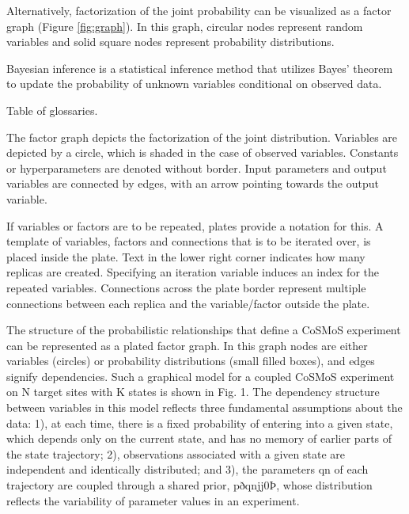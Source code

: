 Alternatively, factorization of the joint probability can be visualized as a factor graph (Figure \ref{fig:graph}). In this graph, circular nodes represent random variables and solid square nodes represent probability distributions.

Bayesian inference is a statistical inference method that utilizes Bayes' theorem to update the probability of unknown variables conditional on observed data.

Table of glossaries.

The factor graph depicts the factorization of the joint distribution. Variables are depicted by a circle, which is shaded in the case of observed variables. Constants or hyperparameters are denoted without border. Input parameters and output variables are connected by edges, with an arrow pointing towards the output variable.

If variables or factors are to be repeated, plates provide a notation for this. A template of variables, factors and connections that is to be iterated over, is placed inside the plate. Text in the lower right corner indicates how many replicas are created. Specifying an iteration variable induces an index for the repeated variables. Connections across the plate border represent multiple connections between each replica and the variable/factor outside the plate.

The structure of the probabilistic relationships that define a CoSMoS experiment can be represented as a plated factor graph. In this graph nodes are either variables (circles) or probability distributions (small filled boxes), and edges signify dependencies. Such a graphical model for a coupled CoSMoS experiment on N target sites with K states is shown in Fig. 1. The dependency structure between
variables in this model reflects three fundamental assumptions about the
data: 1), at each time, there is a fixed probability of entering into a given
state, which depends only on the current state, and has no memory of earlier
parts of the state trajectory; 2), observations associated with a given state
are independent and identically distributed; and 3), the parameters qn of
each trajectory are coupled through a shared prior, pðqnjj0Þ, whose distribution reflects the variability of parameter values in an experiment.

